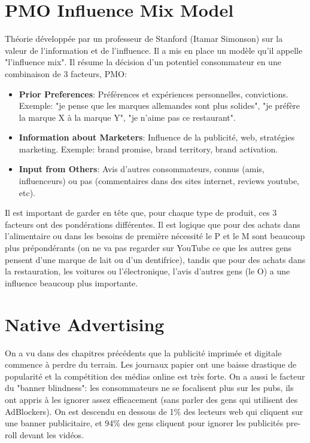 \vspace{-1.2cm}

\section{PMO Influence Mix Model}

Théorie développée par un professeur de Stanford (Itamar Simonson) sur la valeur de l'information et de l'influence. Il a mis en place un modèle qu'il appelle "l'influence mix". Il résume la décision d'un potentiel consommateur en une combinaison de 3 facteurs, PMO:

\begin{itemize}
    \item \textbf{Prior Preferences}: Préférences et expériences personnelles, convictions. Exemple: "je pense que les marques allemandes sont plus solides", "je préfère la marque X à la marque Y", "je n'aime pas ce restaurant".
    \item \textbf{Information about Marketers}: Influence de la publicité, web, stratégies marketing. Exemple: brand promise, brand territory, brand activation.
    \item \textbf{Input from Others}: Avis d'autres consommateurs, connus (amis, influenceurs) ou pas (commentaires dans des sites internet, reviews youtube, etc).\\
\end{itemize}

Il est important de garder en tête que, pour chaque type de produit, ces 3 facteurs ont des pondérations différentes. Il est logique que pour des achats dans l'alimentaire ou dans les besoins de première nécessité le P et le M sont beaucoup plus prépondérants (on ne va pas regarder sur YouTube ce que les autres gens pensent d'une marque de lait ou d'un dentifrice), tandis que pour des achats dans la restauration, les voitures ou l'électronique, l'avis d'autres gens (le O) a une influence beaucoup plus importante.

\section{Native Advertising}

On a vu dans des chapitres précédents que la publicité imprimée et digitale commence à perdre du terrain. Les journaux papier ont une baisse drastique de popularité et la compétition des médias online est très forte. On a aussi le facteur du "banner blindness": les consommateurs ne se focalisent plus sur les pubs, ils ont appris à les ignorer assez efficacement (sans parler des gens qui utilisent des AdBlockers). On est descendu en dessous de 1\% des lecteurs web qui cliquent sur une banner publicitaire, et 94\% des gens cliquent pour ignorer les publicités pre-roll devant les vidéos.

